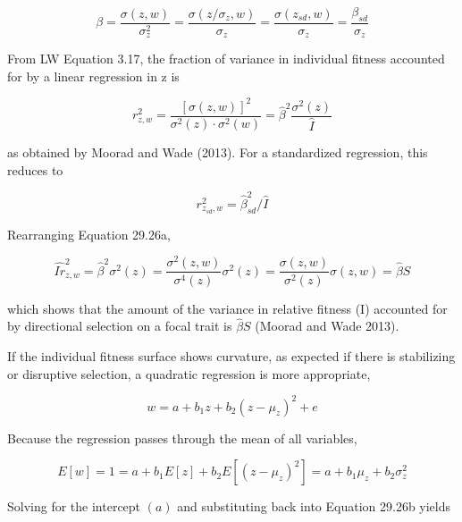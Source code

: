 \documentclass{article}
\begin{document}
\begin{equation}
\beta=\frac{\sigma(z,w)}{\sigma_{z}^{2}}=\frac{\sigma(z/\sigma_{z},w)}{\sigma_{z}}=\frac{\sigma(z_{sd},w)}{\sigma_{z}}=\frac{\beta_{sd}}{\sigma_{z}}
\tag{29.25e}
\label{eq:29_25e}
\end{equation}

From LW Equation 3.17, the fraction of variance in individual fitness accounted for by a linear regression in z is

\begin{equation}
r_{z,w}^{2}=\frac{\left[\sigma(z,w)\right]^{2}}{\sigma^{2}(z)\cdot\sigma^{2}(w)}=\widehat{\beta}^{2}\frac{\sigma^{2}(z)}{\widehat{I}}
\tag{29.26a}
\label{eq:29_26a}
\end{equation}

as obtained by Moorad and Wade (2013). For a standardized regression, this reduces to

\begin{equation}
r_{z_{sd},w}^{2}=\widehat{\beta}_{sd}^{2}/\widehat{I}
\tag{29.26b}
\label{eq:29_26b}
\end{equation}

Rearranging Equation 29.26a,

\begin{equation}
\widehat{I r}_{z,w}^{2}=\widehat{\beta}^{2}\sigma^{2}(z)=\frac{\sigma^{2}(z,w)}{\sigma^{4}(z)}\sigma^{2}(z)=\frac{\sigma(z,w)}{\sigma^{2}(z)}\sigma(z,w)=\widehat{\beta}S
\tag{29.26c}
\label{eq:29_26c}
\end{equation}

which shows that the amount of the variance in relative fitness (I) accounted for by directional selection on a focal trait is  $ \widehat{\beta}S $ (Moorad and Wade 2013).

If the individual fitness surface shows curvature, as expected if there is stabilizing or disruptive selection, a quadratic regression is more appropriate,

\begin{equation}
w=a+b_{1}z+b_{2}(z-\mu_{z})^{2}+e
\tag{29.27a}
\label{eq:29_27a}
\end{equation}

Because the regression passes through the mean of all variables,

\begin{equation}
E[w]=1=a+b_{1}E[z]+b_{2}E[(z-\mu_{z})^{2}]=a+b_{1}\mu_{z}+b_{2}\sigma_{z}^{2}
\end{equation}

Solving for the intercept  $ (a) $ and substituting back into Equation 29.26b yields
\end{document}

